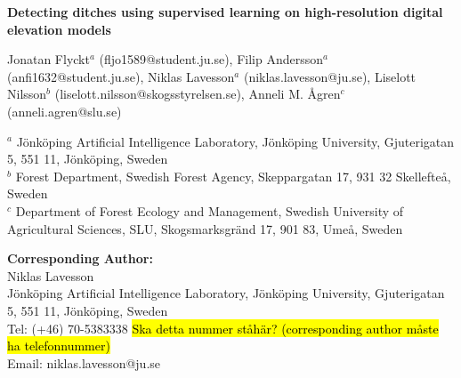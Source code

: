 \documentclass[11pt, review]{elsarticle} %
\begin{document}
\begin{frontmatter}


\begin{titlepage}
\begin{center}
\vspace*{1cm}

\textbf{ \large Detecting ditches using supervised learning on high-resolution digital elevation models}

\vspace{1.5cm}

Jonatan Flyckt$^{a}$ (fljo1589@student.ju.se), Filip Andersson$^{a}$ (anfi1632@student.ju.se), Niklas Lavesson$^a$ (niklas.lavesson@ju.se), Liselott Nilsson$^b$ (liselott.nilsson@skogsstyrelsen.se), Anneli M. \AA gren$^c$ (anneli.agren@slu.se) \\

\hspace{10pt}

\begin{flushleft}
\small  
$^a$ J\"onk\"oping Artificial Intelligence Laboratory, J\"onk\"oping University, Gjuterigatan 5, 551 11, J\"onk\"oping, Sweden \\
$^b$ Forest Department, Swedish Forest Agency, Skeppargatan 17, 931 32 Skellefte\aa, Sweden \\
$^c$ Department of Forest Ecology and Management, Swedish University of Agricultural Sciences, SLU, Skogsmarksgr\"and 17, 901 83, Ume\aa, Sweden

\vspace{1cm}
\textbf{Corresponding Author:} \\
Niklas Lavesson \\
J\"onk\"oping Artificial Intelligence Laboratory, J\"onk\"oping University, Gjuterigatan 5, 551 11, J\"onk\"oping, Sweden \\
Tel: (+46) 70-5383338 \hl{Ska detta nummer st\aa  h\"ar? (corresponding author m\aa ste ha telefonnummer)} \\
Email: niklas.lavesson@ju.se

\end{flushleft}        
\end{center}
\end{titlepage}


\end{frontmatter}
\end{document}
